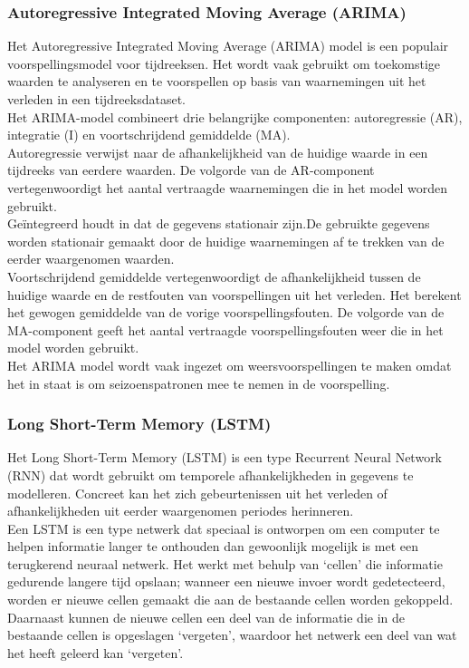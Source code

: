 \subsubsection{Autoregressive Integrated Moving Average (ARIMA)}

Het Autoregressive Integrated Moving Average (ARIMA) model is een populair voorspellingsmodel voor tijdreeksen. Het wordt vaak gebruikt om toekomstige waarden te analyseren en te voorspellen op basis van waarnemingen uit het verleden in een tijdreeksdataset.\\

Het ARIMA-model combineert drie belangrijke componenten: autoregressie (AR), integratie (I) en voortschrijdend gemiddelde (MA). \\

Autoregressie verwijst naar de afhankelijkheid van de huidige waarde in een tijdreeks van eerdere waarden. De volgorde van de AR-component vertegenwoordigt het aantal vertraagde waarnemingen die in het model worden gebruikt. \\

Geïntegreerd houdt in dat de gegevens stationair zijn.De gebruikte gegevens worden stationair gemaakt door de huidige waarnemingen af te trekken van de eerder waargenomen waarden. \\

Voortschrijdend gemiddelde vertegenwoordigt de afhankelijkheid tussen de huidige waarde en de restfouten van voorspellingen uit het verleden. Het berekent het gewogen gemiddelde van de vorige voorspellingsfouten. De volgorde van de MA-component geeft het aantal vertraagde voorspellingsfouten weer die in het model worden gebruikt. \\

Het ARIMA model wordt vaak ingezet om weersvoorspellingen te maken omdat het in staat is om seizoenspatronen mee te nemen in de voorspelling. 

\subsubsection{Long Short-Term Memory (LSTM)}

Het Long Short-Term Memory (LSTM) is een type Recurrent Neural Network (RNN) dat wordt gebruikt om temporele afhankelijkheden in gegevens te modelleren. Concreet kan het zich gebeurtenissen uit het verleden of afhankelijkheden uit eerder waargenomen periodes herinneren. \\

Een LSTM is een type netwerk dat speciaal is ontworpen om een computer te helpen informatie langer te onthouden dan gewoonlijk mogelijk is met een terugkerend neuraal netwerk. Het werkt met behulp van ‘cellen’ die informatie gedurende langere tijd opslaan; wanneer een nieuwe invoer wordt gedetecteerd, worden er nieuwe cellen gemaakt die aan de bestaande cellen worden gekoppeld. Daarnaast kunnen de nieuwe cellen een deel van de informatie die in de bestaande cellen is opgeslagen ‘vergeten’, waardoor het netwerk een deel van wat het heeft geleerd kan ‘vergeten’. \\

